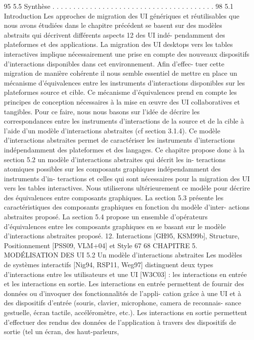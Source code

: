 \documentclass{article}
\begin{document}
95
5.5
Synthèse
. . . . . . . . . . . . . . . . . . . . . . . . . . . . . . . . . . . . . . .
98
5.1
Introduction
Les approches de migration des UI génériques et réutilisables que nous avons étudiées dans le
chapitre précédent se basent sur des modèles abstraits qui décrivent différents aspects 12 des UI indé-
pendamment des plateformes et des applications.
La migration des UI desktops vers les tables interactives implique nécessairement une prise en
compte des nouveaux dispositifs d’interactions disponibles dans cet environnement. Aﬁn d’effec-
tuer cette migration de manière cohérente il nous semble essentiel de mettre en place un mécanisme
d’équivalences entre les instruments d’interactions disponibles sur les plateformes source et cible.
Ce mécanisme d’équivalences prend en compte les principes de conception nécessaires à la mise en
œuvre des UI collaboratives et tangibles. Pour ce faire, nous nous basons sur l’idée de décrire les
correspondances entre les instruments d’interactions de la source et de la cible à l’aide d’un modèle
d’interactions abstraites (cf section 3.1.4). Ce modèle d’interactions abstraites permet de caractériser
les instruments d’interactions indépendamment des plateformes et des langages.
Ce chapitre propose donc à la section 5.2 un modèle d’interactions abstraites qui décrit les in-
teractions atomiques possibles sur les composants graphiques indépendamment des instruments d’in-
teractions et celles qui sont nécessaires pour la migration des UI vers les tables interactives. Nous
utiliserons ultérieurement ce modèle pour décrire des équivalences entre composants graphiques. La
section 5.3 présente les caractéristiques des composants graphiques en fonction du modèle d’inter-
actions abstraites proposé. La section 5.4 propose un ensemble d’opérateurs d’équivalences entre les
composants graphiques en se basant sur le modèle d’interactions abstraites proposé.
12. Interactions [GH95, KSM99b], Structure, Positionnement [PSS09, VLM+04] et Style
67
68
CHAPITRE 5. MODÉLISATION DES UI
5.2
Un modèle d’interactions abstraites
Les modèles de systèmes interactifs [Nig94, RSP11, Weg97] distinguent deux types d’interactions
entre les utilisateurs et une UI [W3C03] : les interactions en entrée et les interactions en sortie. Les
interactions en entrée permettent de fournir des données ou d’invoquer des fonctionnalités de l’appli-
cation grâce à une UI et à des dispositifs d’entrée (souris, clavier, microphone, camera de reconnais-
sance gestuelle, écran tactile, accéléromètre, etc.). Les interactions en sortie permettent d’effectuer des
rendus des données de l’application à travers des dispositifs de sortie (tel un écran, des haut-parleurs,
\end{document}
